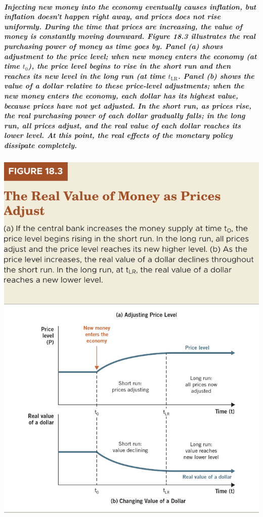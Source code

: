 \documentclass[11pt]{article} %
\begin{document}
\subparagraph*{Injecting new money into the economy eventually causes inflation, but inflation doesn't happen right away, and prices does not rise uniformly. During the time that prices are increasing, the value of money is constantly moving downward. Figure 18.3 illustrates the real purchasing power of money as time goes by. Panel (a) shows adjustment to the price level; when new money enters the economy (at time $t_0$), the price level begins to rise in the short run and then reaches its new level in the long run (at time $t_{\text{LR}}$. Panel (b) shows the value of a dollar relative to these price-level adjustments; when the new money enters the economy, each dollar has its highest value, because prices have not yet adjusted. In the short run, as prices rise, the real purchasing power of each dollar gradually falls; in the long run, all prices adjust, and the real value of each dollar reaches its lower level. At this point, the real effects of the monetary policy dissipate completely.}

\begin{center}
\includegraphics[scale=0.5]{images/Figure 18.3.png} 
\end{center}
\end{document}
